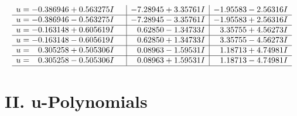\documentclass[1p]{elsarticle_modified}
\theoremstyle{definition}
\begin{document}
$$\begin{array}{c|c|c}
\begin{aligned}
u &= -0.386946 + 0.563275 I\end{aligned}
 & -7.28945 + 3.35761 I & -1.95583 - 2.56316 I \\ \hline\begin{aligned}
u &= -0.386946 - 0.563275 I\end{aligned}
 & -7.28945 - 3.35761 I & -1.95583 + 2.56316 I \\ \hline\begin{aligned}
u &= -0.163148 + 0.605619 I\end{aligned}
 & \phantom{-}0.62850 - 1.34733 I & \phantom{-}3.35755 + 4.56273 I \\ \hline\begin{aligned}
u &= -0.163148 - 0.605619 I\end{aligned}
 & \phantom{-}0.62850 + 1.34733 I & \phantom{-}3.35755 - 4.56273 I \\ \hline\begin{aligned}
u &= \phantom{-}0.305258 + 0.505306 I\end{aligned}
 & \phantom{-}0.08963 - 1.59531 I & \phantom{-}1.18713 + 4.74981 I \\ \hline\begin{aligned}
u &= \phantom{-}0.305258 - 0.505306 I\end{aligned}
 & \phantom{-}0.08963 + 1.59531 I & \phantom{-}1.18713 - 4.74981 I\\
 \hline 
 \end{array}$$\newpage
\newpage\renewcommand{\arraystretch}{1}
\centering \section*{ II. u-Polynomials}
\end{document}
